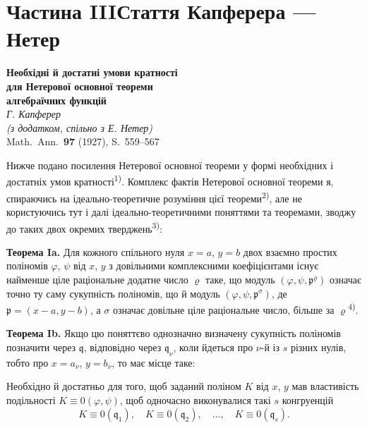 \documentclass[11pt]{article}
\newcommand{\foreign}[1]{#1}
\theoremstyle{plain}
\begin{document}
\newpage
\part*{Частина III\hspace{1em}Стаття Капферера --- Нетер}

\begin{center}
\Large\textbf{Необхідні й достатні умови кратності}\\[0.3em]
\Large\textbf{для Нетерової основної теореми}\\[0.5em]
\large\textbf{алгебраїчних функцій}\\[1em]
\normalsize\textit{Г. Капферер}\\[0.5em]
\small\textit{(з додатком, спільно з Е. Нетер)}\\[1em]
\normalsize \foreign{Math.\ Ann.}\ \textbf{97} (1927), S.~559--567
\end{center}

\vspace{1em}

Нижче подано посилення Нетерової основної теореми у формі
необхідних і достатніх умов кратності\textsuperscript{1)}. Комплекс
фактів Нетерової основної теореми я, спираючись на
ідеально-теоретичне розуміння цієї теореми\textsuperscript{2)}, але
не користуючись тут і далі ідеально-теоретичними поняттями та
теоремами, зводжу до таких двох окремих тверджень\textsuperscript{3)}:

\smallskip
\textbf{Теорема Ia.} Для кожного спільного нуля $x = a$, $y = b$
двох взаємно простих поліномів $\varphi$, $\psi$ від $x$, $y$ з
довільними комплексними коефіцієнтами існує найменше ціле
раціональне додатне число $\varrho$ таке, що модуль
$(\varphi, \psi, \mathfrak{p}^{\varrho})$ означає точно ту саму
сукупність поліномів, що й модуль
$(\varphi, \psi, \mathfrak{p}^{\sigma})$, де
$\mathfrak{p} = (x-a, y-b)$, а $\sigma$ означає довільне ціле
раціональне число, більше за $\varrho$\textsuperscript{4)}.

\smallskip
\textbf{Теорема Ib.} Якщо цю поняттєво однозначно визначену
сукупність поліномів позначити через $\mathfrak{q}$, відповідно
через $\mathfrak{q}_{\nu}$, коли йдеться про $\nu$-й із $s$ різних
нулів, тобто про $x = a_{\nu}$, $y = b_{\nu}$, то має місце таке:

Необхідно й достатньо для того, щоб заданий поліном $K$ від $x$, $y$
мав властивість подільності $K \equiv 0(\varphi, \psi)$, щоб
одночасно виконувалися такі $s$ конгруенцій
\[
K \equiv 0(\mathfrak{q}_{1}), \quad K \equiv 0(\mathfrak{q}_{2}), \quad\ldots,\quad
K \equiv 0(\mathfrak{q}_{s}).
\]
\end{document}
